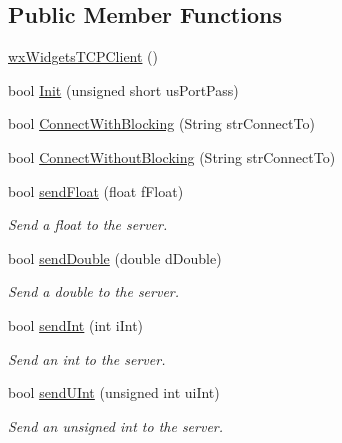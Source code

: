 \subsection*{Public Member Functions}
\begin{DoxyCompactItemize}
\item 
\hyperlink{class_rad_jav_1_1_networking_1_1wx_widgets_t_c_p_client_a6b7a30ac7bab4cf3fba684cb0e1cd657}{wx\+Widgets\+T\+C\+P\+Client} ()
\item 
bool \hyperlink{class_rad_jav_1_1_networking_1_1wx_widgets_t_c_p_client_a00e601af0b5376aad73af1678f59ef03}{Init} (unsigned short us\+Port\+Pass)
\item 
bool \hyperlink{class_rad_jav_1_1_networking_1_1wx_widgets_t_c_p_client_a1b56360f810775c5b4a4fb36c65601a2}{Connect\+With\+Blocking} (String str\+Connect\+To)
\item 
bool \hyperlink{class_rad_jav_1_1_networking_1_1wx_widgets_t_c_p_client_a626d2b1513aaa9f9cbbdb5d32ccff63c}{Connect\+Without\+Blocking} (String str\+Connect\+To)
\item 
bool \hyperlink{class_rad_jav_1_1_networking_1_1wx_widgets_t_c_p_client_ae55381591149dba6639db08a614eeea4}{send\+Float} (float f\+Float)
\begin{DoxyCompactList}\small\item\em Send a float to the server. \end{DoxyCompactList}\item 
bool \hyperlink{class_rad_jav_1_1_networking_1_1wx_widgets_t_c_p_client_a06b0248538e1d52736bd3dd9cab4a663}{send\+Double} (double d\+Double)
\begin{DoxyCompactList}\small\item\em Send a double to the server. \end{DoxyCompactList}\item 
bool \hyperlink{class_rad_jav_1_1_networking_1_1wx_widgets_t_c_p_client_af41970d0e28c934fb506eaa6774b090e}{send\+Int} (int i\+Int)
\begin{DoxyCompactList}\small\item\em Send an int to the server. \end{DoxyCompactList}\item 
bool \hyperlink{class_rad_jav_1_1_networking_1_1wx_widgets_t_c_p_client_a0e251a186501c2caf49d10e5a86dd302}{send\+U\+Int} (unsigned int ui\+Int)
\begin{DoxyCompactList}\small\item\em Send an unsigned int to the server. \end{DoxyCompactList}\item 

\end{DoxyCompactItemize}
